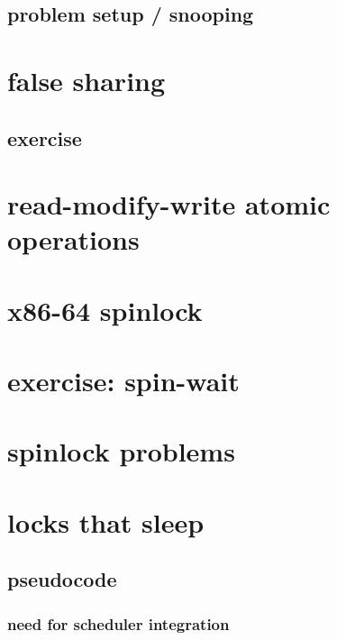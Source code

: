 \subsection{problem setup / snooping}


\section{false sharing}


\subsection{exercise}


\section{read-modify-write atomic operations}


\section{x86-64 spinlock}


\section{exercise: spin-wait}


\section{spinlock problems}


\section{locks that sleep}



\subsection{pseudocode}


\subsubsection{need for scheduler integration}


